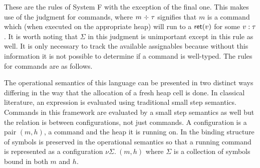 These are the rules of System F with the exception of the final
one. This makes use of the judgment for commands, where
$m \mathrel{\div} \tau$ signifies that $m$ is a command which (when executed
on the appropriate heap) will run to a $\mathsf{ret}(v)$ for some
$v \mathrel{:} \tau$. It is worth noting that $\Sigma$ in this judgment is
unimportant except in this rule as well. It is only necessary to track
the available assignables because without this information it is not
possible to determine if a command is well-typed. The rules for
commands are as follows.
The operational semantics of this language can be presented in two
distinct ways differing in the way that the allocation of a fresh heap
cell is done. In classical literature, an expression is evaluated
using traditional small step semantics. Commands in this framework are
evaluated by a small step semantics as well but the relation is
between configurations, not just commands. A configuration is a pair
$(m, h)$, a command and the heap it is running on. In
\citet{Harper:16} the binding structure of symbols is preserved in the
operational semantics so that a running command is represented as a
configuration $\nu \Sigma.\ (m, h)$ where $\Sigma$ is a collection of
symbols bound in both $m$ and $h$.

